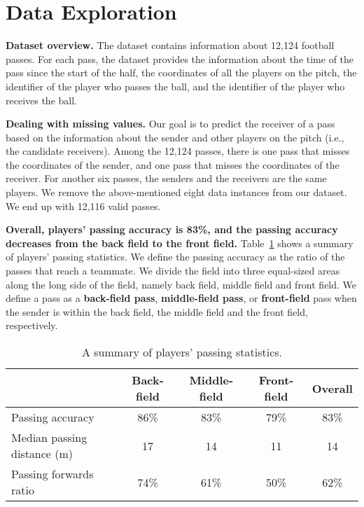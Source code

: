\section{Data Exploration} %
\label{sec:data-exploration}

\textbf{Dataset overview.}
The dataset contains information about 12,124 football passes.
For each pass, the dataset provides the information about the time of the pass since the start of the half, the coordinates of all the players on the pitch, the identifier of the player who passes the ball, and the identifier of the player who receives the ball.

\textbf{Dealing with missing values.}
Our goal is to predict the receiver of a pass based on the information about the sender and other players on the pitch (i.e., the candidate receivers).
Among the 12,124 passes, there is one pass that misses the coordinates of the sender, and one pass that misses the coordinates of the receiver. 
For another six passes, the senders and the receivers are the same players.
We remove the above-mentioned eight data instances from our dataset.
We end up with 12,116 valid passes.

\textbf{Overall, players' passing accuracy is 83\%, and the passing accuracy decreases from the back field to the front field.} 
Table~\ref{tab:pass-statistics} shows a summary of players' passing statistics. 
We define the passing accuracy as the ratio of the passes that reach a teammate.
We divide the field into three equal-sized areas along the long side of the field, namely back field, middle field and front field.
We define a pass as a \textbf{back-field pass}, \textbf{middle-field pass}, or \textbf{front-field} pass when the sender is within the back field, the middle field and the front field, respectively.

\begin{table}[!t]
\caption{A summary of players' passing statistics.}
\centering
\renewcommand{\tabcolsep}{3pt}
\begin{tabular}{lcccc}
  \toprule
  & Back-field & Middle-field & Front-field & Overall \\
  \midrule
  Passing accuracy & 86\% & 83\% & 79\% & 83\% \\
  Median passing distance (m) & 17 & 14 & 11 & 14 \\
  Passing forwards ratio & 74\% & 61\% & 50\% & 62\% \\
  \bottomrule
\end{tabular}
\label{tab:pass-statistics}
\end{table}

